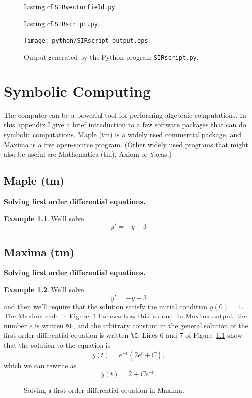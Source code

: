 \documentclass[reqno]{immbook}
\numberwithin{equation}{chapter}
\numberwithin{question}{section}
\numberwithin{theorem}{chapter}
\numberwithin{figure}{chapter}
\theoremstyle{definition}
\newtheorem{example}{Example}[section]
\begin{document}
%
%
\begin{figure}
\fbox{%

}
\caption{Listing of \texttt{SIRvectorfield.py}.}
\label{fig:pythonSIRvflisting}
\end{figure}

\begin{figure}
\fbox{%

}
\caption{Listing of \texttt{SIRscript.py}.}
\label{fig:pythonSIRscriptlisting}
\end{figure}

\begin{figure}
\centerline{\texttt{[image: python/SIRscript\_output.eps]}}
\caption{Output generated by the Python program
\texttt{SIRscript.py}.}
\label{fig:pythonSIRscriptoutput}
\end{figure}
%
%
\chapter{Symbolic Computing}
The computer can be a powerful tool for performing
algebraic computations.  In this appendix I give a brief introduction
to a few software packages that can do symbolic computations.
Maple (tm) is a widely used commercial
package, and Maxima is a free open-source
program.
(Other widely used programs that might also be useful
are Mathematica (tm), Axiom or Yacas.)
\section{Maple (tm)}
\textbf{Solving first order differential equations.}
\begin{example}
We'll solve
\[
   y' = -y + 3
\]
\end{example}
\section{Maxima (tm)}
\textbf{Solving first order differential equations.}
\begin{example}
We'll solve
\[
   y' = -y + 3
\]
and then we'll require that the solution satisfy the
initial condition $y(0)=1$.
The Maxima code in Figure~\ref{fig:maxima_example_firstorderde} shows how this is done.
In Maxima output, the number $e$ is written \texttt{\%E},
and the arbitrary constant in the general solution of
the first order differential equation is written \texttt{\%C}.
Lines 6 and 7 of Figure~\ref{fig:maxima_example_firstorderde} show that the
solution to the equation is
\[
    y(t) = e^{-t}\left(2 e^{t} + C\right),
\]
which we can rewrite as
\[
    y(t) = 2 + C e^{-t}.
\]
\begin{figure}[hbp]
\fbox{%

}
\caption{Solving a first order differential
equation in Maxima.}
\label{fig:maxima_example_firstorderde}
\end{figure}
\end{example}
%
\end{document}
